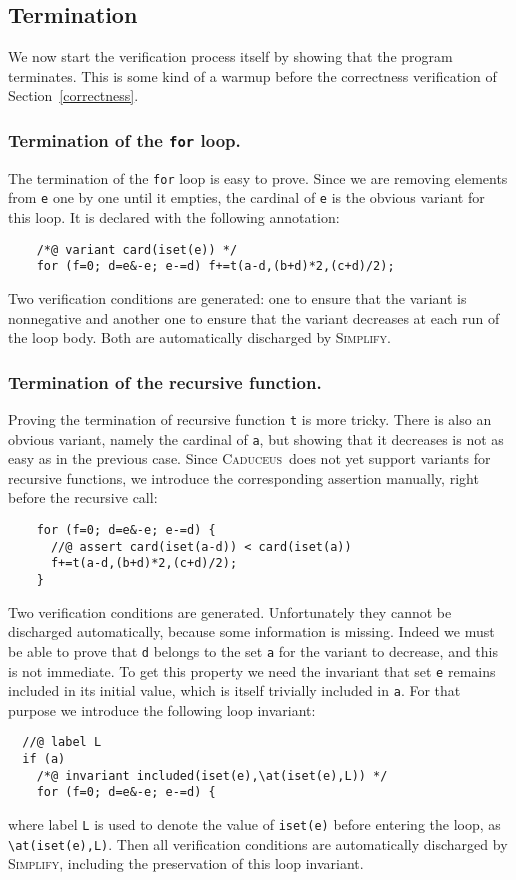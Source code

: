 \documentclass[a4paper]{llncs}
\newcommand{\caduceus}{\textsc{Caduceus}}
\newcommand{\simplify}{\textsc{Simplify}}
\begin{document}
\subsection{Termination}

We now start the verification process itself by showing that the
program terminates. This is some kind of a warmup before the
correctness verification of Section~\ref{correctness}.

\subsubsection{Termination of the \texttt{for} loop.}
The termination of the \texttt{for} loop is easy to prove.
Since we are removing elements from \texttt{e} one by one until it
empties, the cardinal of \texttt{e} is the obvious variant for this
loop. It is declared with the following annotation:
\begin{verbatim}
    /*@ variant card(iset(e)) */
    for (f=0; d=e&-e; e-=d) f+=t(a-d,(b+d)*2,(c+d)/2);
\end{verbatim}
Two verification conditions are generated: one to ensure that the
variant is nonnegative and another one to ensure that the variant
decreases at each run of the loop body. Both are automatically
discharged by \simplify.

\subsubsection{Termination of the recursive function.}
Proving the termination of recursive function \texttt{t} is more
tricky. There is also an obvious variant, namely the cardinal of
\texttt{a}, but showing that it decreases is not as easy as in the
previous case. Since \caduceus\ does not yet support variants for
recursive functions, we introduce the corresponding
assertion manually, right before the recursive call:
\begin{verbatim}
    for (f=0; d=e&-e; e-=d) {
      //@ assert card(iset(a-d)) < card(iset(a))
      f+=t(a-d,(b+d)*2,(c+d)/2); 
    }
\end{verbatim}
Two verification conditions are generated. 
Unfortunately they cannot be discharged automatically, because 
some information is missing. Indeed we must be able to prove that
\texttt{d} belongs to the set \texttt{a} for the variant to decrease,
and this is not immediate. To get this property we need the invariant
that set \texttt{e} remains included in its initial value, which
is itself trivially included in \texttt{a}. For that purpose we
introduce the following loop invariant:
\begin{verbatim}
  //@ label L
  if (a)
    /*@ invariant included(iset(e),\at(iset(e),L)) */
    for (f=0; d=e&-e; e-=d) {
\end{verbatim}
where label \texttt{L} is used to denote the value of
\verb!iset(e)! before entering the loop, as \verb!\at(iset(e),L)!.
Then all verification conditions are automatically discharged by
\simplify, including the preservation of this loop invariant.
\end{document}
